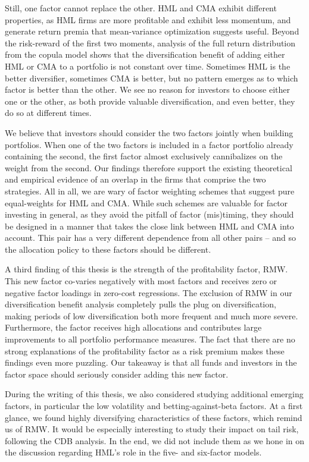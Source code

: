 Still, one factor cannot replace the other. HML and CMA exhibit different properties, as HML firms are more profitable and exhibit less momentum, and generate return premia that mean-variance optimization suggests useful. Beyond the risk-reward of the first two moments, analysis of the full return distribution from the copula model shows that the diversification benefit of adding either HML or CMA to a portfolio is not constant over time. Sometimes HML is the better diversifier, sometimes CMA is better, but no pattern emerges as to which factor is better than the other. We see no reason for investors to choose either one or the other, as both provide valuable diversification, and even better, they do so at different times.

We believe that investors should consider the two factors jointly when building portfolios. When one of the two factors is included in a factor portfolio already containing the second, the first factor almost exclusively cannibalizes on the weight from the second. Our findings therefore support the existing theoretical and empirical evidence of an overlap in the firms that comprise the two strategies. All in all, we are wary of factor weighting schemes that suggest pure equal-weights for HML and CMA. While such schemes are valuable for factor investing in general, as they avoid the pitfall of factor (mis)timing, they should be designed in a manner that takes the close link between HML and CMA into account. This pair has a very different dependence from all other pairs -- and so the allocation policy to these factors should be different.

A third finding of this thesis is the strength of the profitability factor, RMW. This new factor co-varies negatively with most factors and receives zero or negative factor loadings in zero-cost regressions. The exclusion of RMW in our diversification benefit analysis completely pulls the plug on diversification, making periods of low diversification both more frequent and much more severe. Furthermore, the factor receives high allocations and contributes large improvements to all portfolio performance measures. The fact that there are no strong explanations of the profitability factor as a risk premium makes these findings even more puzzling. Our takeaway is that all funds and investors in the factor space should seriously consider adding this new factor.

During the writing of this thesis, we also considered studying additional emerging factors, in particular the low volatility and betting-against-beta factors. At a first glance, we found highly diversifying characteristics of these factors, which remind us of RMW. It would be especially interesting to study their impact on tail risk, following the CDB analysis. In the end, we did not include them as we hone in on the discussion regarding HML's role in the five- and six-factor models.

